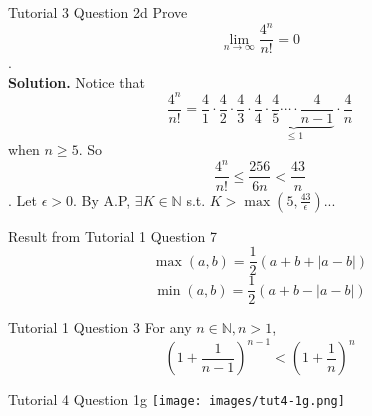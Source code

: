 \documentclass[10pt,landscape]{article}
\theoremstyle{definition}
\newcommand{\thistheoremname}{}
\newtheorem*{genericthm*}{\thistheoremname}
\newenvironment{namedthm*}[1]
{\renewcommand{\thistheoremname}{#1}\begin{genericthm*}}
{\end{genericthm*}}
\begin{document}
\begin{multicols}{3}
\begin{namedthm*}{Tutorial 3 Question 2d}
Prove $$\lim_{n \rightarrow \infty}{\frac{4^n}{n!}} = 0$$.\\
\textbf{Solution.} Notice that 
$$\frac{4^n}{n!} = \frac{4}{1}\cdot\frac{4}{2}\cdot\frac{4}{3}\cdot\underbrace{\frac{4}{4}\cdot\frac{4}{5}\cdots\cdot\frac{4}{n-1}}_\text{$\leq 1$}\cdot\frac{4}{n}$$ when $n \geq 5$. So $$\frac{4^n}{n!} \leq \frac{256}{6n} < \frac{43}{n}$$. Let $\epsilon > 0$. By A.P, $\exists K \in \mathbb{N}$ s.t. $K > \max(5,\frac{43}{\epsilon})$...
\end{namedthm*}
\begin{namedthm*}{Result from Tutorial 1 Question 7}
$$\max(a,b) = \frac{1}{2}\left(a + b + |a-b|\right)$$
$$\min(a,b) = \frac{1}{2}\left(a + b - |a-b|\right)$$
\end{namedthm*}

\begin{namedthm*}{Tutorial 1 Question 3}
For any $n \in \mathbb{N}, n > 1$,$$\left(1+\frac{1}{n-1}\right)^{n-1}<\left(1+\frac{1}{n}\right)^{n}$$
\end{namedthm*}

\begin{namedthm*}{Tutorial 4 Question 1g}
\texttt{[image: images/tut4-1g.png]}
\end{namedthm*}






\end{multicols}
\end{document}
